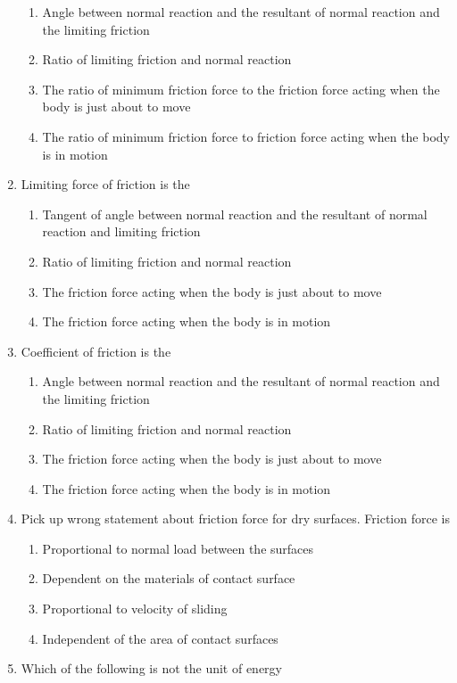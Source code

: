 \documentclass[11pt,a4paper]{article}
\begin{document}
\begin{enumerate}
\begin{enumerate}[label=\Alph*.]
\item{Angle between normal reaction and the resultant of normal reaction and the limiting friction}
\item{Ratio of limiting friction and normal reaction}
\item{The ratio of minimum friction force to the friction force acting when the body is just about to move}
\item{The ratio of minimum friction force to friction force acting when the body is in motion}
\end{enumerate}
\item{Limiting force of friction is the}
\begin{enumerate}[label=\Alph*.]
\item{Tangent of angle between normal reaction and the resultant of normal reaction and limiting friction}
\item{Ratio of limiting friction and normal reaction}
\item{The friction force acting when the body is just about to move}
\item{The friction force acting when the body is in motion}
\end{enumerate}
\item{Coefficient of friction is the}
\begin{enumerate}[label=\Alph*.]
\item{Angle between normal reaction and the resultant of normal reaction and the limiting friction}
\item{Ratio of limiting friction and normal reaction}
\item{The friction force acting when the body is just about to move}
\item{The friction force acting when the body is in motion}
\end{enumerate}
\item{Pick up wrong statement about friction force for dry surfaces. Friction force is}
\begin{enumerate}[label=\Alph*.]
\item{Proportional to normal load between the surfaces}
\item{Dependent on the materials of contact surface}
\item{Proportional to velocity of sliding}
\item{Independent of the area of contact surfaces}
\end{enumerate}
\item{Which of the following is not the unit of energy}

\end{enumerate}
\end{document}
